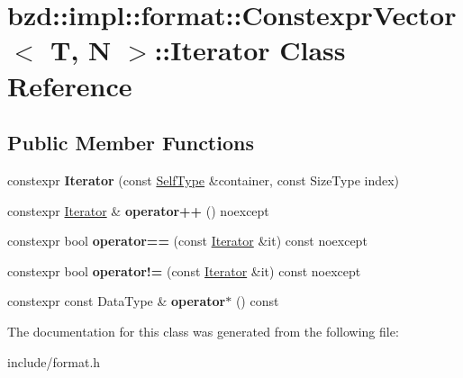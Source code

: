 \hypertarget{classbzd_1_1impl_1_1format_1_1ConstexprVector_1_1Iterator}{}\section{bzd\+:\+:impl\+:\+:format\+:\+:Constexpr\+Vector$<$ T, N $>$\+:\+:Iterator Class Reference}
\label{classbzd_1_1impl_1_1format_1_1ConstexprVector_1_1Iterator}
\subsection*{Public Member Functions}
\begin{DoxyCompactItemize}
\item 
\mbox{\label{classbzd_1_1impl_1_1format_1_1ConstexprVector_1_1Iterator_a3462865023796fe8c5a29dcc53121b59}} 
constexpr {\bfseries Iterator} (const \hyperlink{classbzd_1_1impl_1_1format_1_1ConstexprVector}{Self\+Type} \&container, const Size\+Type index)
\item 
\mbox{\label{classbzd_1_1impl_1_1format_1_1ConstexprVector_1_1Iterator_a96d947a380f40521fbcdc8fec95719b7}} 
constexpr \hyperlink{classbzd_1_1impl_1_1format_1_1ConstexprVector_1_1Iterator}{Iterator} \& {\bfseries operator++} () noexcept
\item 
\mbox{\label{classbzd_1_1impl_1_1format_1_1ConstexprVector_1_1Iterator_af8227004fe5aad4df6d5424a9f9c9961}} 
constexpr bool {\bfseries operator==} (const \hyperlink{classbzd_1_1impl_1_1format_1_1ConstexprVector_1_1Iterator}{Iterator} \&it) const noexcept
\item 
\mbox{\label{classbzd_1_1impl_1_1format_1_1ConstexprVector_1_1Iterator_ac32af8d99cbfb7ee423a62437353ea66}} 
constexpr bool {\bfseries operator!=} (const \hyperlink{classbzd_1_1impl_1_1format_1_1ConstexprVector_1_1Iterator}{Iterator} \&it) const noexcept
\item 
\mbox{\label{classbzd_1_1impl_1_1format_1_1ConstexprVector_1_1Iterator_acb5bcf8391cf86bd46f0dc5e8103805a}} 
constexpr const Data\+Type \& {\bfseries operator$\ast$} () const
\end{DoxyCompactItemize}


The documentation for this class was generated from the following file\+:\begin{DoxyCompactItemize}
\item 
include/format.\+h\end{DoxyCompactItemize}
